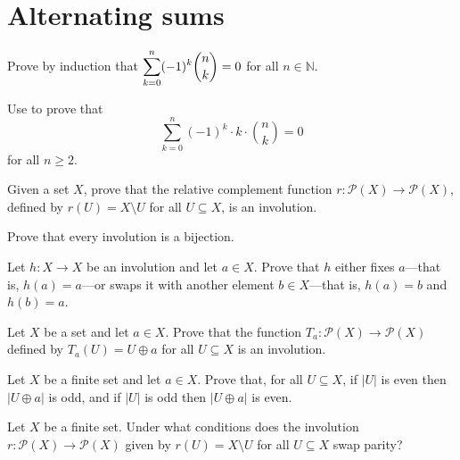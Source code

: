 \section{Alternating sums}

\begin{exercise}
Prove by induction that $\displaystyle \sum_{k=0}^n (-1)^k \dbinom{n}{k} = 0$ for all $n \in \mathbb{N}$.
\end{exercise}


\begin{exercise}
\label{exAlternatingSumOfKTimesBinomialCoefficientByPrimitiveInvolutionPrinciple}
Use  to prove that
\[ \displaystyle \sum_{k=0}^n (-1)^k \cdot k \cdot \binom{n}{k} = 0 \]
for all $n \ge 2$.
\end{exercise}


\begin{exercise}
Given a set $X$, prove that the relative complement function $r : \mathcal{P}(X) \to \mathcal{P}(X)$, defined by $r(U) = X \setminus U$ for all $U \subseteq X$, is an involution.
\end{exercise}

\begin{exercise}
Prove that every involution is a bijection.
\end{exercise}

\begin{exercise}
Let $h : X \to X$ be an involution and let $a \in X$. Prove that $h$ either fixes $a$---that is, $h(a)=a$---or swaps it with another element $b \in X$---that is, $h(a)=b$ and $h(b)=a$.
\end{exercise}

\begin{exercise}
\label{exToggleIsInvolution}
Let $X$ be a set and let $a \in X$. Prove that the function $T_a : \mathcal{P}(X) \to \mathcal{P}(X)$ defined by $T_a(U) = U \oplus a$ for all $U \subseteq X$ is an involution.
\end{exercise}

\begin{exercise}
\label{exToggleSwapsParity}
Let $X$ be a finite set and let $a \in X$. Prove that, for all $U \subseteq X$, if $|U|$ is even then $|U \oplus a|$ is odd, and if $|U|$ is odd then $|U \oplus a|$ is even.
\end{exercise}


\begin{exercise}
Let $X$ be a finite set. Under what conditions does the involution $r : \mathcal{P}(X) \to \mathcal{P}(X)$ given by $r(U) = X \setminus U$ for all $U \subseteq X$ swap parity?
\end{exercise}

